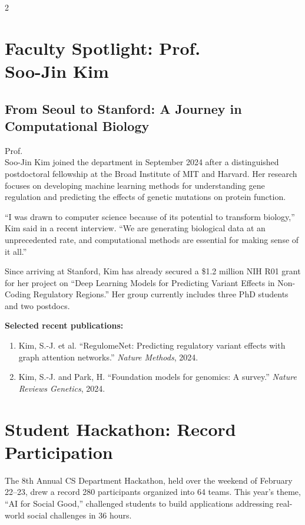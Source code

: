 \documentclass[10pt,a4paper]{article}
\begin{document}
\begin{multicols}{2}
\section{Faculty Spotlight: Prof.\\ Soo-Jin Kim}

\subsection{From Seoul to Stanford: A Journey in Computational Biology}

Prof.\\ Soo-Jin Kim joined the department in September 2024 after a distinguished postdoctoral fellowship at the Broad Institute of MIT and Harvard. Her research focuses on developing machine learning methods for understanding gene regulation and predicting the effects of genetic mutations on protein function.

``I was drawn to computer science because of its potential to transform biology,'' Kim said in a recent interview. ``We are generating biological data at an unprecedented rate, and computational methods are essential for making sense of it all.''

Since arriving at Stanford, Kim has already secured a \$1.2 million NIH R01 grant for her project on ``Deep Learning Models for Predicting Variant Effects in Non-Coding Regulatory Regions.'' Her group currently includes three PhD students and two postdocs.

\textbf{Selected recent publications:}
\begin{enumerate}[leftmargin=1.5em, nosep, itemsep=2pt]
  \item Kim, S.-J. et al. ``RegulomeNet: Predicting regulatory variant effects with graph attention networks.'' \textit{Nature Methods}, 2024.
  \item Kim, S.-J. and Park, H. ``Foundation models for genomics: A survey.'' \textit{Nature Reviews Genetics}, 2024.
\end{enumerate}

\section{Student Hackathon: Record Participation}

The 8th Annual CS Department Hackathon, held over the weekend of February 22--23, drew a record 280 participants organized into 64 teams. This year's theme, ``AI for Social Good,'' challenged students to build applications addressing real-world social challenges in 36 hours.


\end{multicols}
\end{document}
